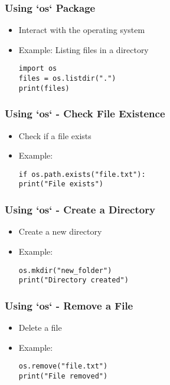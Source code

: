 \documentclass{beamer}
\begin{document}
\begin{frame}
    \frametitle{Using `os` Package}
    \begin{itemize}
        \item Interact with the operating system
        \item Example: Listing files in a directory
        \begin{tcolorbox}[colback=lightblue, colframe=darkblue, title=List Files]
            \lstinline|import os| \\
            \lstinline|files = os.listdir(".")| \\
            \lstinline|print(files)|
        \end{tcolorbox}
    \end{itemize}
\end{frame}

\begin{frame}
    \frametitle{Using `os` - Check File Existence}
    \begin{itemize}
        \item Check if a file exists
        \item Example:
        \begin{tcolorbox}[colback=lightblue, colframe=darkblue, title=Check File]
            \lstinline|if os.path.exists("file.txt"):| \\
            \hspace{10pt} \lstinline|print("File exists")|
        \end{tcolorbox}
    \end{itemize}
\end{frame}

\begin{frame}
    \frametitle{Using `os` - Create a Directory}
    \begin{itemize}
        \item Create a new directory
        \item Example:
        \begin{tcolorbox}[colback=lightblue, colframe=darkblue, title=Create Directory]
            \lstinline|os.mkdir("new_folder")| \\
            \lstinline|print("Directory created")|
        \end{tcolorbox}
    \end{itemize}
\end{frame}

\begin{frame}
    \frametitle{Using `os` - Remove a File}
    \begin{itemize}
        \item Delete a file
        \item Example:
        \begin{tcolorbox}[colback=lightblue, colframe=darkblue, title=Remove File]
            \lstinline|os.remove("file.txt")| \\
            \lstinline|print("File removed")|
        \end{tcolorbox}
    \end{itemize}
\end{frame}
\end{document}
